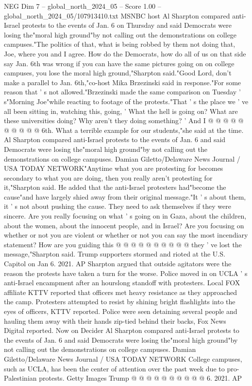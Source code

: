 \begin{textsample}{NEG Dim 7 – global\_north\_2024\_05 – Score 1.00 – global\_north\_2024\_05/107913410.txt}  \label{ex:f7_neg_404}
MSNBC host Al Sharpton compared anti-Israel protests to the events of Jan. 6 on Thursday and said Democrats were losing the"moral high ground"by not calling out the demonstrations on college campuses."The politics of that, what is being robbed by them not doing that, Joe, where you and I agree.
How do the Democrats, how do all of us on that side say Jan. 6th was wrong if you can have the same pictures going on on college campuses, you lose the moral high ground,"Sharpton said."Good Lord, don't make a parallel to Jan. 6th,"co-host Mika Brzezinski said in response."For some reason that ' s not allowed."Brzezinski made the same comparison on Tuesday ' s"Morning Joe"while reacting to footage of the protests."That ' s the place we ' ve all been sitting in, watching this, going, ' What the hell is going on?
What are these universities doing?
Why aren't they doing something? ' And I @ @ @ @ @ @ @ @ @ @ 6th.
What a terrible example for our students,"she said at the time.
Al Sharpton compared anti-Israel protests to the events of Jan. 6 and said Democrats were losing the"moral high ground"by not calling out the demonstrations on college campuses.
Damian Giletto/Delaware News Journal / USA TODAY NETWORK"Anytime what you are protesting for becomes secondary to what you are doing, then you really aren't protesting for it,"Sharpton said.
He added that the anti-Israel protesters had"become the cause"and have largely shied away from their original message."It ' s about them, it ' s not about pushing the cause.
They need to ask themselves if they were sincere.
Are you really focusing on what ' s going on in Gaza, about the children, about the women, about the innocent people, and in Israel?
Are you focusing on whether or not you are violent or whether or not you can say the most incendiary statement?
How are you guiding this @ @ @ @ @ @ @ @ @ @ they ' ve lost the message,"Sharpton said.
Trump supporters stormed and rioted at the U.S.
Capitol on Jan 6. 2021.
AP Sharpton argued that outside agitators were the reason the protests have taken a turn for the worse.
Police moved in on UCLA ' s anti-Israel encampment after an hourslong standoff with protesters.
Local FOX affiliate KTTV reported that officers met heavy resistance as they approached the camp.
Protesters attempted to resist by shining bright flashlights into the eyes of officers, KTTV reported.
Police were seen detaining several people and hauling them away with their hands zip-tied behind their backs, Fox News Digital reported.
Now on Decider Al Sharpton compared anti-Israel protests to the events of Jan. 6 and said Democrats were losing the"moral high ground"by not calling out the demonstrations on college campuses.
Damian Giletto/Delaware News Journal / USA TODAY NETWORK College campuses, such as UCLA, has been the center of attention over the past week due to pro-Palestinian protests.
Getty Images Trump @ @ @ @ @ @ @ @ @ @ 6. 2021.
AP

\end{textsample}
